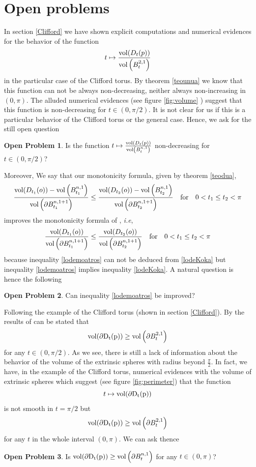 \documentclass{amsart}
\theoremstyle{definition}
\newtheorem{open}{Open Problem}
\theoremstyle{remark}
\begin{document}
\section{Open problems}
In section \ref{Clifford} we have shown explicit computations and numerical evidences for the behavior of the function $$t\mapsto \frac{{\rm vol}(D_t(p))}{{\rm vol}\left(B^{2,1}_t\right)}$$ in the particular case of the Clifford torus. By theorem \ref{teounua} we know that this function can not   be always non-decreasing, neither always non-increasing in $(0, \pi)$.  The alluded numerical evidences (see figure \ref{fig:volume} ) suggest that this function is non-decreasing for $t\in (0,\pi/2)$. It is not clear for us if this is a particular behavior of the Clifford torus or the general case. Hence, we ask for the still open question
\begin{open}
Is the function 
$t\mapsto \frac{{\rm vol}(D_t(p))}{{\rm vol}\left(B^{n,1}_t\right)}$
non-decreasing for $t\in (0,\pi/2)$?
\end{open}
Moreover, We say that our monotonicity formula, given by theorem \ref{teodua}, 
\begin{equation}\label{lodemoatros}
\frac{{\rm vol}(D_{t_1}(o))-{\rm vol}\left(B^{n,1}_{t_1}\right)}{{\rm vol}\left( \partial B^{n,1+1}_{t_1}\right)}   \leq  \frac{{\rm vol}(D_{t_2}(o))-{\rm vol}\left(B^{n,1}_{t_2}\right)}{{\rm vol}\left( \partial B^{n,1+1}_{t_2}\right)} \quad {\rm for}\quad 0<t_1\leq t_2<\pi
\end{equation}
improves the monotonicity formula of \cite{Kokarev2021}, \emph{i.e},
\begin{equation}\label{lodeKoka}
\frac{{\rm vol}(D_{t_1}(o))}{{\rm vol}\left( \partial B^{n,1+1}_{t_1}\right)}   \leq  \frac{{\rm vol}(D_{t_2}(o))}{{\rm vol}\left( \partial B^{n,1+1}_{t_2}\right)} \quad {\rm for}\quad 0<t_1\leq t_2<\pi
\end{equation}
because inequality \eqref{lodemoatros} can not be deduced from \eqref{lodeKoka} but inequality \eqref{lodemoatros} implies inequality \eqref{lodeKoka}. A natural question is hence the following
\begin{open}
Can inequality \eqref{lodemoatros} be improved?
\end{open}

Following the example of the Clifford torus (shown in section \ref{Clifford}).  By the results of \cite{CLY1984} can be stated that 
$$
{\rm vol(\partial D_t(p)})\geq {\rm vol}\left(\partial B^{2,1}_t\right)
$$
for any $t\in (0,\pi/2)$. As we see, there is still a lack of information about the behavior of the volume of the extrinsic spheres with radius beyond $\frac{\pi}{2}$. In fact, we have, in the  example of the Clifford torus, numerical evidences with the volume of extrinsic spheres which suggest (see figure \ref{fig:perimeter}) that the function 
$$
t\mapsto {\rm vol(\partial D_t(p)})
$$
is not smooth in $t=\pi/2$ but 
$$
{\rm vol(\partial D_t(p)})\geq {\rm vol}\left(\partial B^{2,1}_t\right)
$$
for any $t$ in the whole interval $(0,\pi)$. We can ask thence
\begin{open}
Is 
$
{\rm vol(\partial D_t(p)})\geq {\rm vol}\left(\partial B^{n,1}_t\right)
$
for any $t\in (0,\pi)$?
\end{open}
\end{document}
